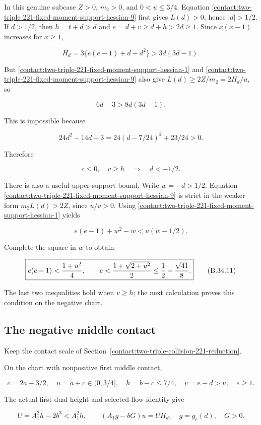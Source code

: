 In this genuine subcase $Z>0$, $m_2>0$, and $0<u\le 3/4$. Equation \eqref{contact:two-triple-221-fixed-moment-support-hessian-9}
first gives $L(d)>0$, hence $|d|>1/2$. If $d>1/2$, then $h=t+d>d$
and $e=d+v\ge d+h>2d\ge 1$. Since $x(x-1)$ increases for $x\ge 1$,

\[
 H_d=3\{e(e-1)+d-d^2\}>3d(3d-1).
\]

But \eqref{contact:two-triple-221-fixed-moment-support-hessian-1} and \eqref{contact:two-triple-221-fixed-moment-support-hessian-9} also give $L(d)\ge 2Z/m_2=2H_d/u$, so

\[
 6d-3>8d(3d-1).
\]

This is impossible because

\[
 24d^2-14d+3=24(d-7/24)^2+23/24>0.
\]

Therefore

\[
 \boxed{c\le0,\quad v\ge h\quad\Longrightarrow\quad d<-1/2.} \tag{B.34.10}\label{contact:two-triple-221-fixed-moment-support-hessian-10}
\]

There is also a useful upper-support bound. Write $w=-d>1/2$.
Equation \eqref{contact:two-triple-221-fixed-moment-support-hessian-9} is strict in the weaker form $m_2 L(d)>2Z$, since $u/v>0$.
Using \eqref{contact:two-triple-221-fixed-moment-support-hessian-1} yields

\[
 e(e-1)+w^2-w<u(w-1/2).
\]

Complete the square in $w$ to obtain

\[
 \boxed{e(e-1)<{1+u^2\over4},\qquad
 e<{1+\sqrt{2+u^2}\over2}\le {1\over2}+{\sqrt{41}\over8}.} \tag{B.34.11}\label{contact:two-triple-221-fixed-moment-support-hessian-11}
\]

The last two inequalities hold when $v\ge h$; the next calculation proves this condition on the negative chart.
\subsection{The negative middle contact}\label{contact:two-triple-221-negative-middle-location}
Keep the contact scale of Section~\ref{contact:two-triple-collision-221-reduction}.




On the chart with nonpositive first middle contact,

\[
 c=2a-3/2,\quad u=a+c\in(0,3/4],\quad
 h=b-c\le7/4,\quad v=e-d>u,\quad e\ge1.
\]

The actual first dual height and selected-flow identity give

\[
 U=A_1^2h-2b^3<A_1^2h,\qquad
 (A_1g-bG)u=U H_d,\quad g=g_e(d),\quad G>0.
\tag{B.35.1}\label{contact:two-triple-221-negative-middle-location-1}
\]

